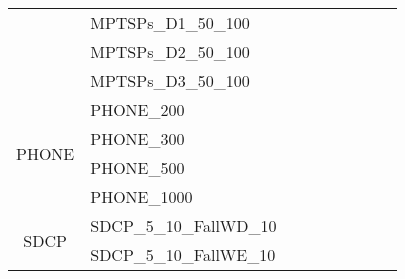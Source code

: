 \begin{table}[]
{\begin{tabular}{|c|l|l|l|l|l|l|l|l|}
			& MPTSPs\_D1\_50\_100           &                                    &                                  &                            &                          &                                         &                                 &                                \\
			& MPTSPs\_D2\_50\_100           &                                    &                                  &                            &                          &                                         &                                 &                                \\
			& MPTSPs\_D3\_50\_100           &                                    &                                  &                            &                          &                                         &                                 &                                \\ \hline
			\multirow{4}{*}{PHONE}   & PHONE\_200                    &                                    &                                  &                            &                          &                                         &                                 &                                \\
			& PHONE\_300                    &                                    &                                  &                            &                          &                                         &                                 &                                \\
			& PHONE\_500                    &                                    &                                  &                            &                          &                                         &                                 &                                \\
			& PHONE\_1000                   &                                    &                                  &                            &                          &                                         &                                 &                                \\ \hline
			\multirow{8}{*}{SDCP}    & SDCP\_5\_10\_FallWD\_10       &                                    &                                  &                            &                          &                                         &                                 &                                \\
			& SDCP\_5\_10\_FallWE\_10       &                                    &                                  &                            &                          &                                         &                                 &                                \\

\end{tabular}}
\end{table}

